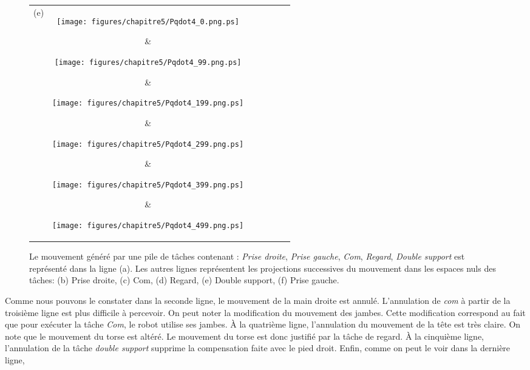\begin{figure*}[p]
\begin{tabular}{c@{}c@{}c@{}c@{}c@{}c@{}c}
(e)&
\parbox[c]{2.2cm}{\texttt{[image: figures/chapitre5/Pqdot4\_0.png.ps]}} &
\parbox[c]{2.2cm}{\texttt{[image: figures/chapitre5/Pqdot4\_99.png.ps]}} &
\parbox[c]{2.2cm}{\texttt{[image: figures/chapitre5/Pqdot4\_199.png.ps]}} &
\parbox[c]{2.2cm}{\texttt{[image: figures/chapitre5/Pqdot4\_299.png.ps]}} &
\parbox[c]{2.2cm}{\texttt{[image: figures/chapitre5/Pqdot4\_399.png.ps]}} &
\parbox[c]{2.2cm}{\texttt{[image: figures/chapitre5/Pqdot4\_499.png.ps]}}\\

(f)&
\parbox[c]{2.2cm}{\texttt{[image: figures/chapitre5/Pqdot5\_0.png.ps]}} &
\parbox[c]{2.2cm}{\texttt{[image: figures/chapitre5/Pqdot5\_99.png.ps]}} &
\parbox[c]{2.2cm}{\texttt{[image: figures/chapitre5/Pqdot5\_199.png.ps]}} &
\parbox[c]{2.2cm}{\texttt{[image: figures/chapitre5/Pqdot5\_299.png.ps]}} &
\parbox[c]{2.2cm}{\texttt{[image: figures/chapitre5/Pqdot5\_399.png.ps]}} &
\parbox[c]{2.2cm}{\texttt{[image: figures/chapitre5/Pqdot5\_499.png.ps]}}\\
\\
Itération & 0 & 99 & 199 & 299 & 399 & 499\\
\end{tabular}
\caption[Illustrations des projections successives.]{Le mouvement généré par une pile de t\^aches contenant :
\emph{Prise droite}, \emph{Prise gauche}, \emph{Com}, \emph{Regard}, \emph{Double support} 
est représenté dans la ligne (a).
Les autres lignes représentent les projections successives du mouvement dans les espaces
nuls des t\^aches: (b) Prise droite, (c) Com, (d) Regard, (e) Double support, (f) Prise gauche.}
\label{fig:snapshotXpqdot}
\end{figure*}
Comme nous pouvons le constater dans la seconde ligne, le mouvement de la main droite est annulé.
L'annulation de \emph{com} à partir de la troisième ligne est plus difficile à percevoir.
On peut noter la modification du mouvement des jambes. Cette modification correspond au fait que pour
exécuter la t\^ache \emph{Com}, le robot utilise ses jambes.
À la quatrième ligne, l'annulation du mouvement de la t\^ete est très claire.
On note que le mouvement du torse est altéré. Le mouvement du torse est donc justifié par
la t\^ache de regard.
À la cinquième
ligne, l'annulation de la t\^ache \emph{double support} supprime la compensation
faite avec le pied droit. Enfin, comme on peut le voir dans la dernière ligne,
